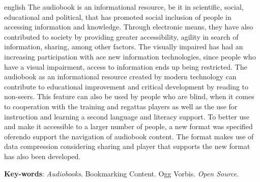 \begin{resumo}[Abstract]
 \begin{otherlanguage*}{english}
The audiobook is an informational resource, be it in scientific, social, educational and political, that has promoted social inclusion of people in accessing information and knowledge. Through electronic means, they have also contributed to society by providing greater accessibility, agility in search of information, sharing, among other factors. The visually impaired has had an increasing participation with ace new information technologies, since people who have a visual impairment, access to information ends up being restricted. The audiobook as an informational resource created by modern technology can contribute to educational improvement and critical development by reading to non-seers. This feature can also be used by people who are blind, when it comes to cooperation with the training and regattas players as well as the use for instruction and learning a second language and literacy support. To better use and make it accessible to a larger number of people, a new format was specified oferendo support the navigation of audiobook content. The format makes use of data compression considering sharing and player that supports the new format has also been developed.

   \vspace{\onelineskip}
 
   \noindent 
   \textbf{Key-words}: \textit{Audiobooks}. Bookmarking Content. Ogg Vorbis. \textit{Open Source}.
 \end{otherlanguage*}
\end{resumo}

